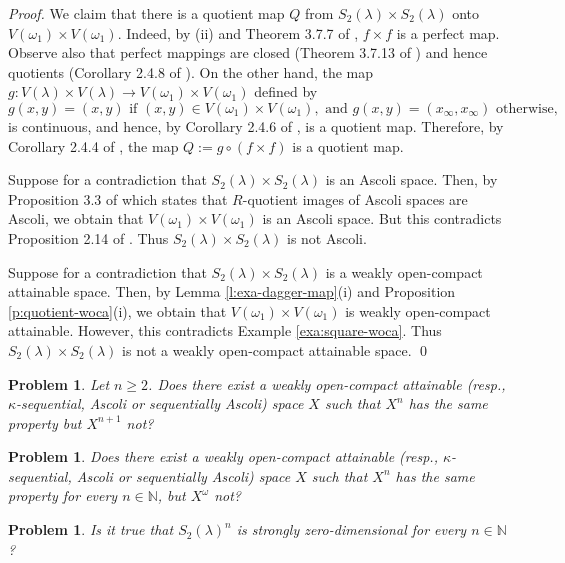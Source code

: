 \documentclass[preprint,11pt]{elsarticle}
\newtheorem{problem}[theorem]{Problem}
\numberwithin{equation}{section}
\numberwithin{theorem}{section}
\newcommand{\w}{\omega}
\newcommand{\NN}{\mathbb{N}}
\begin{document}
\begin{proof}
We claim that there is a quotient map $Q$ from $S_2(\lambda)\times S_2(\lambda)$ onto $V(\w_1)\times V(\w_1)$. Indeed, by (ii) and Theorem 3.7.7 of \cite{Eng}, $f\times f$ is a perfect map. Observe also that perfect mappings are closed (Theorem 3.7.13 of \cite{Eng}) and hence quotients (Corollary 2.4.8 of \cite{Eng}). On the other hand, the map $g:V(\lambda)\times V(\lambda)\to V(\w_1)\times V(\w_1)$ defined by
\[
g(x,y)=(x,y) \mbox{ if } (x,y)\in V(\w_1)\times V(\w_1), \mbox{ and } g(x,y)=(x_\infty,x_\infty) \mbox{ otherwise},
\]
is continuous, and hence, by Corollary 2.4.6 of \cite{Eng}, is a quotient map. Therefore, by Corollary 2.4.4 of \cite{Eng}, the map $Q:=g\circ (f\times f)$ is a quotient map.
\smallskip

Suppose for a contradiction that $S_2(\lambda)\times S_2(\lambda)$ is an Ascoli  space. Then, by Proposition 3.3 of \cite{GR-prod} which states that $R$-quotient images of Ascoli spaces are Ascoli, we obtain that $V(\w_1)\times V(\w_1)$ is an Ascoli space. But this contradicts Proposition 2.14 of \cite{Gabr-seq-Ascoli}. Thus $S_2(\lambda)\times S_2(\lambda)$ is not Ascoli.
\smallskip

Suppose for a contradiction that $S_2(\lambda)\times S_2(\lambda)$ is a weakly open-compact attainable space. Then, by Lemma \ref{l:exa-dagger-map}(i) and Proposition \ref{p:quotient-woca}(i), we obtain that $V(\w_1)\times V(\w_1)$ is weakly open-compact attainable. However, this contradicts Example \ref{exa:square-woca}. Thus $S_2(\lambda)\times S_2(\lambda)$ is not a weakly open-compact attainable space. \qed
\end{proof}


\begin{problem}
Let $n\geq 2$. Does there exist a  weakly open-compact attainable (resp., $\kappa$-sequential, Ascoli or sequentially Ascoli) space $X$ such that $X^n$ has the same property but $X^{n+1}$ not?
\end{problem}


\begin{problem}
Does there exist a  weakly open-compact attainable (resp., $\kappa$-sequential, Ascoli or sequentially Ascoli) space $X$ such that $X^n$ has the same property for every $n\in\NN$, but $X^\w$ not?
\end{problem}

\begin{problem}
Is it true that $S_2(\lambda)^n$ is strongly zero-dimensional for every $n\in\NN$?
\end{problem}
\end{document}
